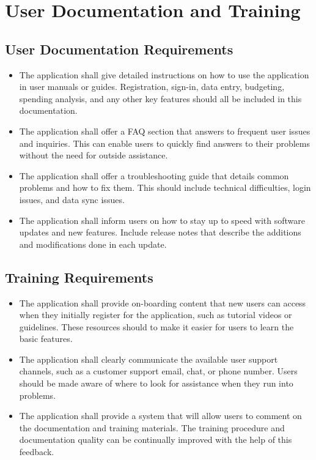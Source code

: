 \documentclass[12pt]{article}
\begin{document}
\section{User Documentation and Training}
\subsection{User Documentation Requirements}
\begin{itemize}
    \item The application shall give detailed instructions on how to use the application in user manuals or guides. Registration, sign-in, data entry, budgeting, spending analysis, and any other key features should all be included in this documentation.
    \item The application shall offer a FAQ section that answers to frequent user issues and inquiries. This can enable users to quickly find answers to their problems without the need for outside assistance.
    \item The application shall offer a troubleshooting guide that details common problems and how to fix them. This should include technical difficulties, login issues, and data sync issues.
    \item The application shall inform users on how to stay up to speed with software updates and new features. Include release notes that describe the additions and modifications done in each update.
\end{itemize}
\subsection{Training Requirements}
\begin{itemize}
    \item The application shall provide on-boarding content that new users can access when they initially register for the application, such as tutorial videos or guidelines. These resources should to make it easier for users to learn the basic features.
    \item The application shall clearly communicate the available user support channels, such as a customer support email, chat, or phone number. Users should be made aware of where to look for assistance when they run into problems.
    \item The application shall provide a system that will allow users to comment on the documentation and training materials. The training procedure and documentation quality can be continually improved with the help of this feedback.
\end{itemize}
\end{document}
